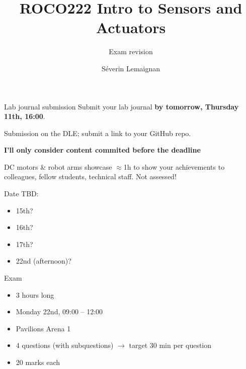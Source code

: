 \documentclass[compress]{beamer}
\title{ROCO222 \newline Intro to Sensors and Actuators}
\subtitle{Exam revision}
\date{}
\author{Séverin Lemaignan}
\institute{Centre for Neural Systems and Robotics\\{\bf Plymouth University}}
\makeatletter
\def\beamer@writeslidentry@miniframesoff{%
  \expandafter\beamer@ifempty\expandafter{\beamer@framestartpage}{}%
  {%
    \clearpage\beamer@notesactions%
  }
}
\newcommand*{\miniframesoff}{\let\beamer@writeslidentry=\beamer@writeslidentry@miniframesoff}
\makeatother
\begin{document}

\maketitle

\miniframesoff

\begin{frame}[plain]{}
    \begin{alertblock}{Lab journal submission}
        Submit your lab journal \textbf{by tomorrow, Thursday 11th, 16:00}.

        Submission on the DLE; submit a link to your GitHub repo.

        \textbf{I'll only consider content commited before the deadline}
    \end{alertblock}
\end{frame}

\begin{frame}{DC motors \& robot arms showcase}
    $\approx$1h to show your achievements to colleagues, fellow students,
    technical staff. Not assessed!

    Date TBD:

    \begin{itemize}
        \item 15th?
        \item 16th?
        \item 17th?
        \item 22nd (afternoon)?
    \end{itemize}
\end{frame}

\begin{frame}{Exam}


    \begin{itemize}
        \item 3 hours long
        \item Monday 22nd, 09:00 – 12:00
        \item Pavilions Arena 1
    \end{itemize}

    \pause

    \begin{itemize}
        \item 4 questions (with subquestions) $\rightarrow$ target 30 min per
            question
        \item 20 marks each
    \end{itemize}


\end{frame}
\end{document}

